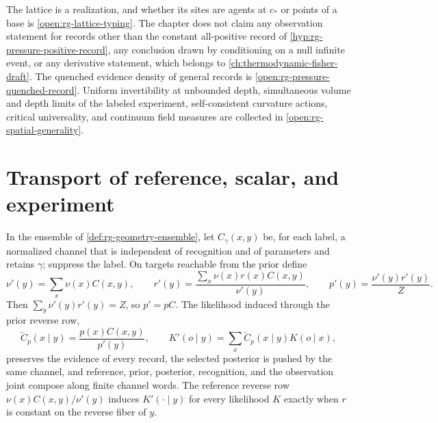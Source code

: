 The lattice is a realization, and whether its sites are agents at $c_*$ or
points of a base is \cref{open:rg-lattice-typing}. The chapter does not claim
any observation statement for records other than the constant all-positive
record of \cref{hyp:rg-pressure-positive-record}, any conclusion drawn by
conditioning on a null infinite event, or any derivative statement, which
belongs to \cref{ch:thermodynamic-fisher-draft}. The quenched evidence
density of general records is \cref{open:rg-pressure-quenched-record}. Uniform invertibility at
unbounded depth, simultaneous volume and depth limits of the labeled
experiment, self-consistent curvature actions, critical universality, and
continuum field measures are collected in \cref{open:rg-spatial-generality}.

\section{Transport of reference, scalar, and experiment}
\label{sec:rg-geometry-transport}

In the ensemble of \cref{def:rg-geometry-ensemble}, let $C_\gamma(x,y)$ be,
for each label, a normalized channel that is independent of recognition and
of parameters and retains $\gamma$; suppress the label. On targets reachable
from the prior define
\begin{equation}
 \nu'(y)=\sum_x\nu(x)C(x,y),\qquad
 r'(y)=\frac{\sum_x\nu(x)r(x)C(x,y)}{\nu'(y)},\qquad
 p'(y)=\frac{\nu'(y)r'(y)}{Z}.
 \label{eq:rg-geometry-raw-push}
\end{equation}
Then $\sum_y\nu'(y)r'(y)=Z$, so $p'=pC$. The likelihood induced through the
prior reverse row,
\begin{equation}
 \overleftarrow C_p(x\mid y)=\frac{p(x)C(x,y)}{p'(y)},\qquad
 K'(o\mid y)=\sum_x\overleftarrow C_p(x\mid y)K(o\mid x),
 \label{eq:rg-geometry-likelihood}
\end{equation}
preserves the evidence of every record, the selected posterior is pushed by
the same channel, and reference, prior, posterior, recognition, and the
observation joint compose along finite channel words. The reference reverse
row $\nu(x)C(x,y)/\nu'(y)$ induces $K'(\cdot\mid y)$ for every likelihood $K$
exactly when $r$ is constant on the reverse fiber of $y$.


